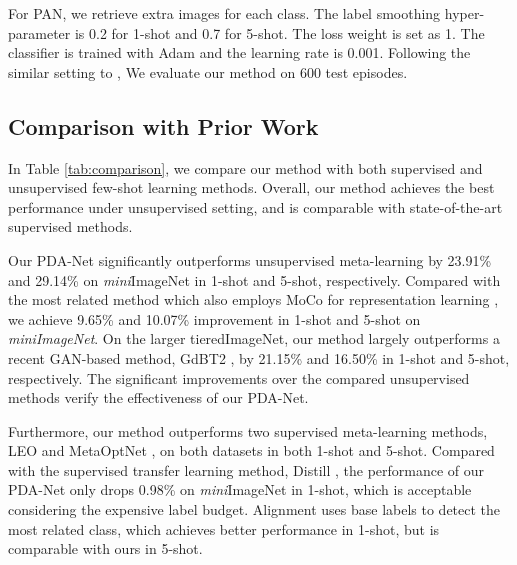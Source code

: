 \documentclass{article}
\begin{document}
For PAN, we retrieve  extra images for each class. The label smoothing hyper-parameter  is 0.2 for 1-shot and 0.7 for 5-shot. The loss weight  is set as 1. The classifier is trained with Adam and the learning rate is 0.001. Following the similar setting to \cite{vinyals2016matching}, We evaluate our method on 600 test episodes.



\begin{table}[t]
\centering
{}
\caption{Ablation study on \emph{mini}ImageNet in 5-way 1-shot.}
\label{tab:ablation}
\end{table}


\subsection{Comparison with Prior Work}
In Table \ref{tab:comparison}, we compare our method with both supervised and unsupervised few-shot learning methods. Overall, our method achieves the best performance under unsupervised setting, and is comparable with state-of-the-art supervised methods.

Our PDA-Net significantly outperforms unsupervised meta-learning \cite{hsu2018unsupervised} by 23.91\% and 29.14\% on \emph{mini}ImageNet in 1-shot and 5-shot, respectively. Compared with the most related method which also employs MoCo for representation learning \cite{10.1007/978-3-030-58568-6_16}, we achieve 9.65\% and 10.07\% improvement in 1-shot and 5-shot on \emph{miniImageNet}. On the larger tieredImageNet, our method largely outperforms a recent GAN-based method, GdBT2 \cite{Khoi2021SSLGAN}, by 21.15\% and 16.50\% in 1-shot and 5-shot, respectively. The significant improvements over the compared unsupervised methods verify the effectiveness of our PDA-Net.


Furthermore, our method outperforms two supervised meta-learning methods, LEO \cite{rusu2018metalearning} and MetaOptNet \cite{Lee2019MetaLearningWD}, on both datasets in both 1-shot and 5-shot. Compared with the supervised transfer learning method, Distill \cite{10.1007/978-3-030-58568-6_16}, the performance of our PDA-Net only drops 0.98\% on \emph{mini}ImageNet in 1-shot, which is acceptable considering the expensive label budget.
Alignment \cite{Afrasiyabi2020AssociativeAF} uses base labels to detect the most related class, which achieves better performance in 1-shot, but is comparable with ours in 5-shot.
\end{document}
